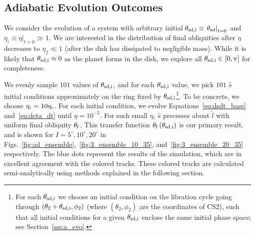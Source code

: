 \documentclass[
        fleqn,
        usenatbib,
        referee,
    ]{mnras}
\newcommand*{\at}[1]{\left.#1\right|}
\newcommand*{\p}[1]{\left(#1\right)}
\begin{document}
\subsection{Adiabatic Evolution Outcomes}\label{ss:ad_ensemble}

We consider the evolution of a system with arbitrary initial $\theta_{\rm sd, i}
\equiv \at{\theta_{\rm sd}}_{t = 0}$ and $\eta_i \equiv \at{\eta}_{t = 0} \gg
1$. We are interested in the distribution of final obliquities after $\eta$
decreases to $\eta_f \ll 1$ (after the disk has dissipated to negligible mass).
While it is likely that $\theta_{\rm sd, i} \approx 0$ as the planet forms in
the disk, we explore all $\theta_{\rm sd, i} \in [0, \pi]$ for completeness.

We evenly sample $101$ values of $\theta_{\rm sd, i}$, and for each $\theta_{\rm
sd, i}$ value, we pick $101$ $\hat{s}$ initial conditions approximately on the
ring fixed by $\theta_{\rm sd, i}$\footnote{For each $\theta_{\rm sd, i}$ we
choose an initial condition on the libration cycle going through $\p{\theta_2 +
\theta_{\rm sd, i}, \phi_2}$ (where $\p{\theta_2, \phi_2}$ are the coordinates
of CS2), such that all initial conditions for a given $\theta_{\rm sd, i}$
enclose the same initial phase space; see Section~\ref{sss:a_evo}.}. To be concrete,
we choose $\eta_i = 10\eta_{\rm c}$. For each initial condition, we evolve
Equations~\ref{eq:dsdt_base} and~\ref{eq:deta_dt} until $\eta = 10^{-5}$. For
such small $\eta$, $\hat{s}$ precesses about $\hat{l}$ with uniform final
obliquity $\theta_{\rm f}$. This transfer function $\theta_{\rm f}\p{\theta_{\rm
sd, i}}$ is our primary result, and is shown for $I = 5^\circ, 10^\circ,
20^\circ$ in Figs.~\ref{fig:ad_ensemble},~\ref{fig:3_ensemble_10_35},
and~\ref{fig:3_ensemble_20_35} respectively. The blue dots represent the results
of the simulation, which are in excellent agreement with the colored tracks.
These colored tracks are calculated semi-analytically using methods explained in
the following section.
\end{document}
